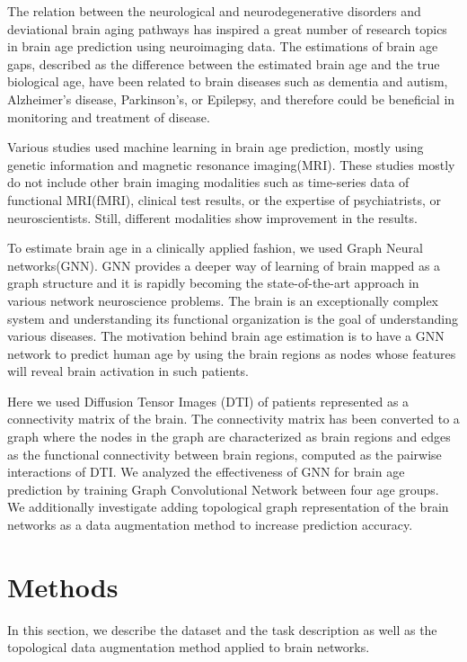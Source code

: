 \documentclass[runningheads]{llncs}
\begin{document}
The relation between the neurological and neurodegenerative disorders and deviational brain aging pathways has inspired a great number of research topics
in brain age prediction using neuroimaging data\cite{kaufmann2019common, bonacich1987power, franke2019ten}. The estimations of brain age gaps, described as
the difference between the estimated brain age and the true
biological age, have been related to brain diseases such as dementia and autism, Alzheimer's disease, Parkinson's, or Epilepsy\cite{nalls2013multicenter, tuncc2019early}, and therefore could be beneficial in monitoring and treatment of disease.

Various studies used machine learning in brain age prediction, mostly using genetic information and magnetic resonance imaging(MRI)\cite{franke2019ten}. These studies mostly
do not include other brain imaging modalities such as time-series data
of functional MRI(fMRI), clinical test results, or the expertise
of psychiatrists, or neuroscientists. Still, different modalities show improvement in the results\cite{kaufmann2019common, besteher2019machine, baecker2021machine}.

To estimate brain age in a clinically applied fashion, we used Graph Neural networks(GNN). GNN
provides a deeper way of learning of brain mapped as a graph structure and it is rapidly becoming the state-of-the-art approach in various network neuroscience problems. The brain is an exceptionally complex system and understanding its functional organization is the goal of understanding various diseases. The motivation behind brain age estimation is to have a GNN network to predict human age by using the brain regions as nodes whose features will reveal brain activation in such patients. 

Here we used Diffusion Tensor Images (DTI) of patients represented as a connectivity matrix of the brain. The connectivity matrix has been converted to a graph where the nodes in the graph are characterized as brain regions and edges as the functional connectivity between brain regions, computed as the pairwise interactions
of DTI.  We analyzed the effectiveness of GNN for brain
age prediction by training Graph Convolutional Network\cite{berg2017graph} between four age groups. We additionally investigate adding topological graph representation of the brain networks as a data augmentation method to increase prediction accuracy. 





\section{Methods}
In this section, we describe the dataset and the task description as well as the topological data augmentation method applied to brain networks.
\end{document}
